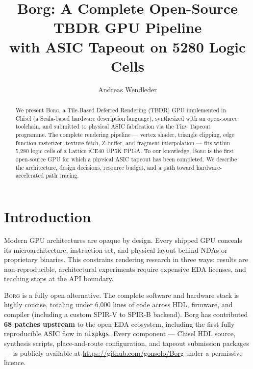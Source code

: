 \documentclass[sigconf,review,natbib=false]{acmart}
\begin{document}
\title{Borg: A Complete Open-Source TBDR GPU Pipeline\\
       with ASIC Tapeout on 5280 Logic Cells}

\author{Andreas Wendleder}

\begin{abstract}
We present \textsc{Borg}, a Tile-Based Deferred Rendering (TBDR) GPU
implemented in Chisel (a Scala-based hardware description language),
synthesized with an open-source toolchain, and submitted to physical
ASIC fabrication via the Tiny Tapeout programme.
The complete rendering pipeline — vertex shader, triangle clipping,
edge function rasterizer, texture fetch, Z-buffer, and fragment
interpolation — fits within 5{,}280 logic cells of a Lattice iCE40 UP5K FPGA.
To our knowledge, \textsc{Borg} is the first open-source GPU
for which a physical ASIC tapeout has been completed.
We describe the architecture, design decisions, resource budget,
and a path toward hardware-accelerated path tracing.
\end{abstract}

\maketitle

\section{Introduction}

Modern GPU architectures are opaque by design.
Every shipped GPU conceals its microarchitecture, instruction set,
and physical layout behind NDAs or proprietary binaries.
This constrains rendering research in three ways:
results are non-reproducible, architectural experiments require
expensive EDA licenses, and teaching stops at the API boundary.

\textsc{Borg} is a fully open alternative.
The complete software and hardware stack is highly concise, totaling under 6{,}000 lines of code across HDL, firmware, and compiler (including a custom SPIR-V to SPIR-B backend).
Borg has contributed \textbf{68 patches upstream} to the open EDA ecosystem, including the first fully reproducible ASIC flow in \texttt{nixpkgs}.
Every component — Chisel HDL source, synthesis scripts, place-and-route
configuration, and tapeout submission packages — is publicly available
at \url{https://github.com/gonsolo/Borg} under a permissive licence.
\end{document}
